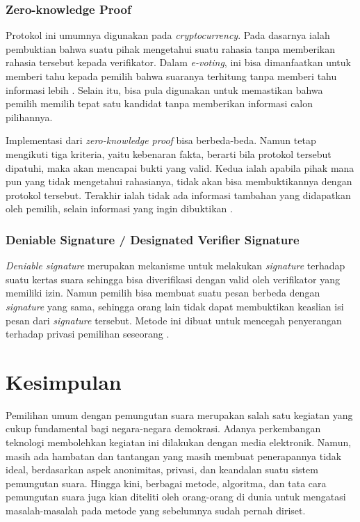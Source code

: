 \documentclass[12pt, a4paper, final]{article}
\begin{document}
\subsubsection{Zero-knowledge Proof}

Protokol ini umumnya digunakan pada \textit{cryptocurrency}. Pada dasarnya ialah pembuktian bahwa suatu pihak mengetahui suatu rahasia tanpa memberikan rahasia tersebut kepada verifikator. Dalam \textit{e-voting}, ini bisa dimanfaatkan untuk memberi tahu kepada pemilih bahwa suaranya terhitung tanpa memberi tahu informasi lebih \cite{zeroknow}. Selain itu, bisa pula digunakan untuk memastikan bahwa pemilih memilih tepat satu kandidat tanpa memberikan informasi calon pilihannya.

Implementasi dari \textit{zero-knowledge proof} bisa berbeda-beda. Namun tetap mengikuti tiga kriteria, yaitu kebenaran fakta, berarti bila protokol tersebut dipatuhi, maka akan mencapai bukti yang valid. Kedua ialah apabila pihak mana pun yang tidak mengetahui rahasianya, tidak akan bisa membuktikannya dengan protokol tersebut. Terakhir ialah tidak ada informasi tambahan yang didapatkan oleh pemilih, selain informasi yang ingin dibuktikan \citep{zeroknow2}. 

\subsubsection{Deniable Signature / Designated Verifier Signature}

\textit{Deniable signature} merupakan mekanisme untuk melakukan \textit{signature} terhadap suatu kertas suara sehingga bisa diverifikasi dengan valid oleh verifikator yang memiliki izin. Namun pemilih bisa membuat suatu pesan berbeda dengan \textit{signature} yang sama, sehingga orang lain tidak dapat membuktikan keaslian isi pesan dari \textit{signature} tersebut. Metode ini dibuat untuk mencegah penyerangan terhadap privasi pemilihan seseorang \cite{deniable}.

\section{Kesimpulan}

Pemilihan umum dengan pemungutan suara merupakan salah satu kegiatan yang cukup fundamental bagi negara-negara demokrasi. Adanya perkembangan teknologi membolehkan kegiatan ini dilakukan dengan media elektronik. Namun, masih ada hambatan dan tantangan yang masih membuat penerapannya tidak ideal, berdasarkan aspek anonimitas, privasi, dan keandalan suatu sistem pemungutan suara. Hingga kini, berbagai metode, algoritma, dan tata cara pemungutan suara juga kian diteliti oleh orang-orang di dunia untuk mengatasi masalah-masalah pada metode yang sebelumnya sudah pernah diriset.
\end{document}
